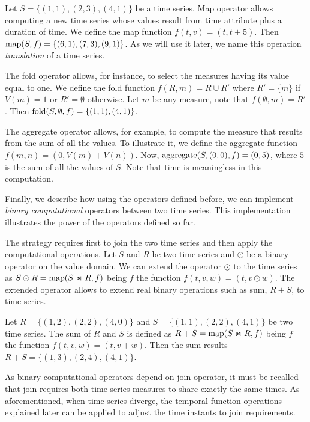 \begin{example}
\label{ex:computational-operators}
Let $S=\{(1,1),(2,3),(4,1)\}$ be a time series.  Map operator allows
computing a new time series whose values result from time attribute
plus a duration of time.  We define the map function
$f(t,v)=(t,t+5)$. Then $\operatorname*{map}(S,f)=\{(6,1),(7,3),(9,1)\}$. As we will
use it later, we name this operation \emph{translation} of a time
series.

The fold operator allows, for instance, to select the measures having
its value equal to one.  We define the fold function $f(R,m)=R\cup R'$
where $R'=\{m\}$ if $V(m)=1$ or $R'=\emptyset$ otherwise. Let $m$ be
any measure, note that $f(\emptyset,m)= R'$. Then
$\operatorname*{fold}(S,\emptyset,f)=\{(1,1),(4,1)\}$.

The aggregate operator allows, for example, to compute the measure
that results from the sum of all the values.  To illustrate it, we
define the aggregate function $f(m,n)=(0,V(m)+V(n))$. Now,
$\operatorname*{aggregate}(S,(0,0),f) = (0,5)$, where $5$ is the sum of all the values of
$S$. Note that time is meaningless in this computation.
\end{example}


Finally, we describe how using the operators defined before, we can
implement \emph{binary computational} operators between two time
series. This implementation illustrates the power of the operators
defined so far.

The strategy requires first to join the two time series and then apply
the computational operations. Let $S$ and $R$ be two time series and
$\odot$ be a binary operator on the value domain. We can extend the
operator $\odot$ to the time series as $S\odot R=\operatorname*{map}(S\Join R, f)$
being $f$ the function $f(t,v,w)=(t,v\odot w)$. The extended operator
allows to extend real binary operations such as sum, $R+S$, to time
series.

\begin{example}
  \label{ex:model:sum}
  Let $R=\{(1,2), (2,2), (4,0)\}$ and $S=\{(1,1), (2,2), (4,1)\}$ be
  two time series.  The sum of $R$ and $S$ is defined as
  $R+S=\operatorname*{map}(S\Join R, f)$ being $f$ the function $f(t,v,w)=(t,v+ w)$.
  Then the sum results $R+S= \{(1,3), (2,4), (4,1)\}$.
\end{example}

As binary computational operators depend on join operator, it must be
recalled that join requires both time series measures to share exactly
the same times. As aforementioned, when time series diverge, the
temporal function operations explained later can be applied to adjust
the time instants to join requirements.




